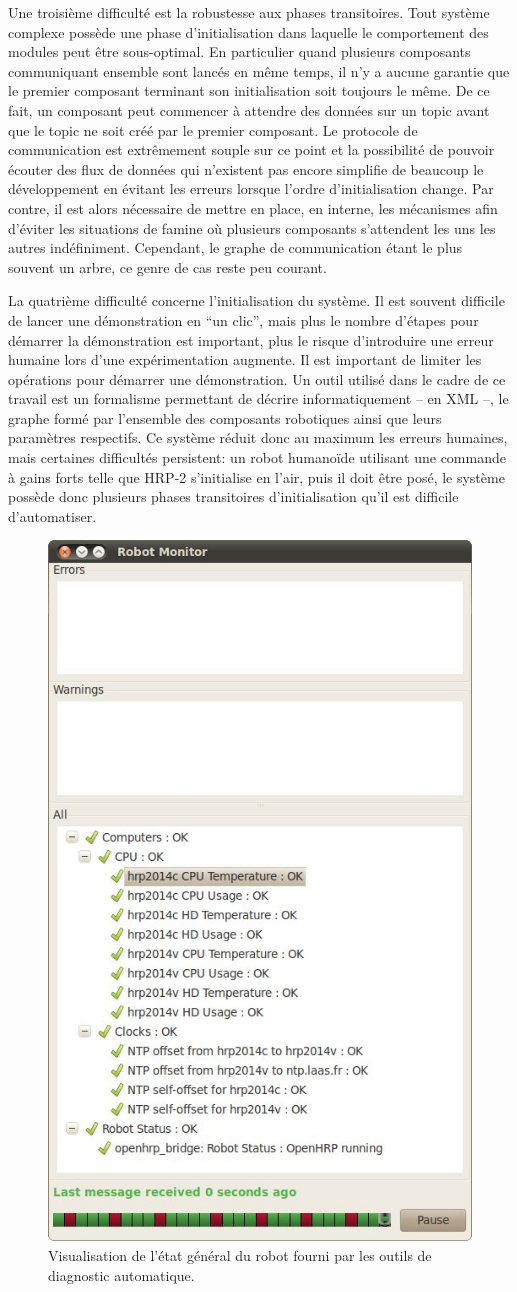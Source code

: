 Une troisième difficulté est la robustesse aux phases
transitoires. Tout système complexe possède une phase d'initialisation
dans laquelle le comportement des modules peut être sous-optimal. En
particulier quand plusieurs composants communiquant ensemble sont
lancés en même temps, il n'y a aucune garantie que le premier
composant terminant son initialisation soit toujours le même. De ce
fait, un composant peut commencer à attendre des données sur un topic
avant que le topic ne soit créé par le premier composant. Le protocole
de communication est extrêmement souple sur ce point et la possibilité
de pouvoir écouter des flux de données qui n'existent pas encore
simplifie de beaucoup le développement en évitant les erreurs lorsque
l'ordre d'initialisation change. Par contre, il est alors nécessaire
de mettre en place, en interne, les mécanismes afin d'éviter les
situations de famine où plusieurs composants s'attendent les uns les
autres indéfiniment. Cependant, le graphe de communication étant le
plus souvent un arbre, ce genre de cas reste peu courant.


La quatrième difficulté concerne l'initialisation du système. Il est
souvent difficile de lancer une démonstration en ``un clic'', mais
plus le nombre d'étapes pour démarrer la démonstration est important,
plus le risque d'introduire une erreur humaine lors d'une
expérimentation augmente. Il est important de limiter les opérations
pour démarrer une démonstration. Un outil utilisé dans le cadre de ce
travail est un formalisme permettant de décrire informatiquement -- en
XML --, le graphe formé par l'ensemble des composants
robotiques ainsi que leurs paramètres respectifs. Ce système réduit
donc au maximum les erreurs humaines, mais certaines difficultés
persistent: un robot humanoïde utilisant une commande à gains forts
telle que HRP-2 s'initialise en l'air, puis il doit être posé, le
système possède donc plusieurs phases transitoires d'initialisation
qu'il est difficile d'automatiser.


\begin{figure}[htbp]
  \begin{center}
    \includegraphics[width=.3\linewidth]{src/chap4-integration/hrp2_diagnostics.jpg}
  \end{center}
  \caption{Visualisation de l'état général du robot fourni par les
    outils de diagnostic automatique.\label{fig:diagnostic}}
\end{figure}



